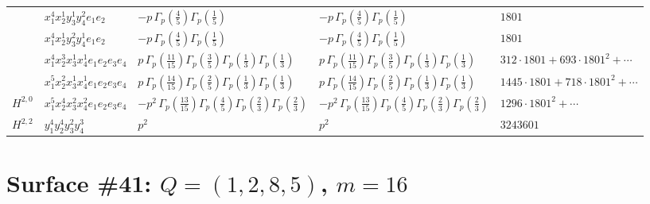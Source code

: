 \documentclass[11pt]{article}
\begin{document}
\begin{table}[ht]
{\begin{tabular}{@{}lllll@{}}
 & $x_{1}^{4} x_{2}^{1} y_{3}^{1} y_{4}^{2} e_{1} e_{2}$ & $- p \, \Gamma_p \left( \frac{4}{5} \right) \Gamma_p \left( \frac{1}{5} \right)$ & $- p \, \Gamma_p \left( \frac{4}{5} \right) \Gamma_p \left( \frac{1}{5} \right)$ & $1801$ \\
 & $x_{1}^{4} x_{2}^{1} y_{3}^{2} y_{4}^{1} e_{1} e_{2}$ & $- p \, \Gamma_p \left( \frac{4}{5} \right) \Gamma_p \left( \frac{1}{5} \right)$ & $- p \, \Gamma_p \left( \frac{4}{5} \right) \Gamma_p \left( \frac{1}{5} \right)$ & $1801$ \\
 & $x_{1}^{4} x_{2}^{3} x_{3}^{1} x_{4}^{1}  e_{1} e_{2} e_{3} e_{4}$ & $p \, \Gamma_p \left( \frac{11}{15} \right) \Gamma_p \left( \frac{3}{5} \right) \Gamma_p \left( \frac{1}{3} \right) \Gamma_p \left( \frac{1}{3} \right)$ & $p \, \Gamma_p \left( \frac{11}{15} \right) \Gamma_p \left( \frac{3}{5} \right) \Gamma_p \left( \frac{1}{3} \right) \Gamma_p \left( \frac{1}{3} \right)$ & $312{\cdot}1801{+}693{\cdot}1801^{2}{+}\cdots$ \\
 & $x_{1}^{5} x_{2}^{2} x_{3}^{1} x_{4}^{1}  e_{1} e_{2} e_{3} e_{4}$ & $p \, \Gamma_p \left( \frac{14}{15} \right) \Gamma_p \left( \frac{2}{5} \right) \Gamma_p \left( \frac{1}{3} \right) \Gamma_p \left( \frac{1}{3} \right)$ & $p \, \Gamma_p \left( \frac{14}{15} \right) \Gamma_p \left( \frac{2}{5} \right) \Gamma_p \left( \frac{1}{3} \right) \Gamma_p \left( \frac{1}{3} \right)$ & $1445{\cdot}1801{+}718{\cdot}1801^{2}{+}\cdots$ \\
\midrule
$H^{2,0}$ & $x_{1}^{5} x_{2}^{4} x_{3}^{2} x_{4}^{2}  e_{1} e_{2} e_{3} e_{4}$ & $- p^{2} \, \Gamma_p \left( \frac{13}{15} \right) \Gamma_p \left( \frac{4}{5} \right) \Gamma_p \left( \frac{2}{3} \right) \Gamma_p \left( \frac{2}{3} \right)$ & $- p^{2} \, \Gamma_p \left( \frac{13}{15} \right) \Gamma_p \left( \frac{4}{5} \right) \Gamma_p \left( \frac{2}{3} \right) \Gamma_p \left( \frac{2}{3} \right)$ & $1296{\cdot}1801^{2}{+}\cdots$ \\
\midrule
$H^{2,2}$ & $y_{1}^{4} y_{2}^{4} y_{3}^{2} y_{4}^{3}$ & $p^{2} \,$ & $p^{2} \,$ & $3243601$ \\
\bottomrule
\end{tabular}
}
\renewcommand{\arraystretch}{1.0}
\end{table}

\newpage

\section*{Surface \#41: $Q=(1, 2, 8, 5)$, $m=16$}
\end{document}
